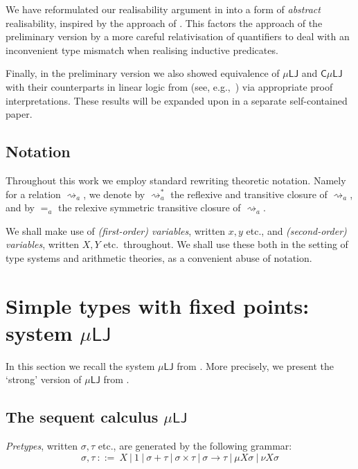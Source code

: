 \documentclass[10pt,a4paper]{amsart}
\theoremstyle{plain}
\theoremstyle{definition}
\newtheorem{defn}[defn]{Definition}
\newcommand{\bnf}{::=}
\theoremstyle{plain}
\theoremstyle{definition} %
\newcommand{\unit}{1}
\newcommand{\arrow}{\to}
\newcommand{\LJ}{\mathsf{LJ}}
\newcommand{\muLJ}{\mu\LJ}
\newcommand{\circular}{\mathsf C}
\newcommand{\cmuLJ}{\circular\muLJ}
\begin{document}
We have reformulated our realisability argument in  into a form of \emph{abstract} realisability, inspired by the approach of \cite{BerTsu21:ifp}. 
This factors the approach of the preliminary version by a more careful relativisation of quantifiers to deal with an inconvenient type mismatch when realising inductive predicates.

Finally, in the preliminary version we also showed equivalence of $\muLJ$ and $\cmuLJ$ with their counterparts in linear logic from (see, e.g.,~\cite{Baelde12,BaeldeDS16Infinitaryprooftheory}) via appropriate proof interpretations.
These results will be expanded upon in a separate self-contained paper.

\subsection{Notation}
% 
Throughout this work we employ standard rewriting theoretic notation. 
Namely for a relation $\rightsquigarrow_a$, we denote by $\rightsquigarrow^*_a$ the reflexive and transitive closure of $\rightsquigarrow_a$, and by $=_{a}$ the relexive symmetric transitive closure of $\rightsquigarrow_a$.

We shall make use of \emph{(first-order) variables}, written $x,y$ etc., and \emph{(second-order) variables}, written $X,Y$ etc.\ throughout.
We shall use these both in the setting of type systems and arithmetic theories, as a convenient abuse of notation.




\section{Simple types with fixed points: system $\muLJ$}
\label{sec:muLJ-prelims}
In this section we recall the system $\muLJ$ from \cite{Clairambault09,Clairambault13interleaving}.
More precisely, we present the `strong' version of $\muLJ$ from \cite{Clairambault13interleaving}.



\subsection{The sequent calculus $\muLJ$}

\emph{Pretypes}, written $\sigma,\tau$ etc., are generated by the following grammar:
\[
\sigma,\tau \ \bnf\  X \ \vert \ \unit \ \vert \ \sigma + \tau \ \vert \ \sigma \times \tau \ \vert \ \sigma \arrow  \tau  \ \vert \ \mu X \sigma \ \vert \ \nu X \sigma      
\]
\end{document}
